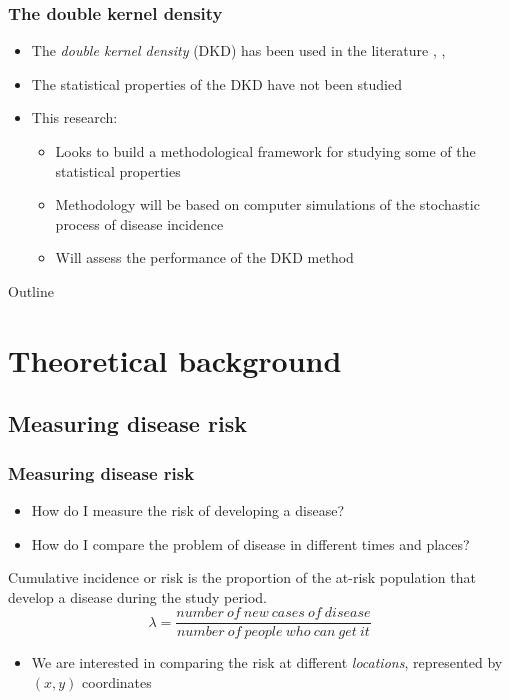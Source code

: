 \documentclass{beamer}
\theoremstyle{definition}
\begin{document}
\begin{frame}\frametitle{The double kernel density}
    \begin{itemize}
        \item The \emph{double kernel density} (DKD) has been used in the literature \cite{kloog2009using}, \cite{portnov2009studying}, \cite{zusman2012residential}
        \item The statistical properties of the DKD have not been studied
        \item This research:
        \begin{itemize}
            \item Looks to build a methodological framework for studying some of the statistical properties
            \item Methodology will be based on computer simulations of the stochastic process of disease incidence
            \item Will assess the performance of the DKD method
        \end{itemize}
    \end{itemize}
\end{frame}

\begin{frame}{Outline}
\tableofcontents[hideallsubsections]
\end{frame}

\section{Theoretical background}

\subsection{Measuring disease risk}
\begin{frame}\frametitle{Measuring disease risk}
    \begin{itemize}
        \item How do I measure the risk of developing a disease?
        \item How do I compare the problem of disease in different times and places?
    \end{itemize}
    \begin{definition}
        \alert{Cumulative incidence} or \alert{risk} is the proportion of the at-risk population that develop a disease during the study period.
        \begin{equation*}
            \lambda = \frac{number~of~new~cases~of~disease}{number~of~people~who~can~get~it}
        \end{equation*}
        \cite{bonita2006basic}
    \end{definition}
    \begin{itemize}
        \item We are interested in comparing the risk at different \emph{locations}, represented by $(x,y)$ coordinates
    \end{itemize}
\end{frame}
\end{document}

